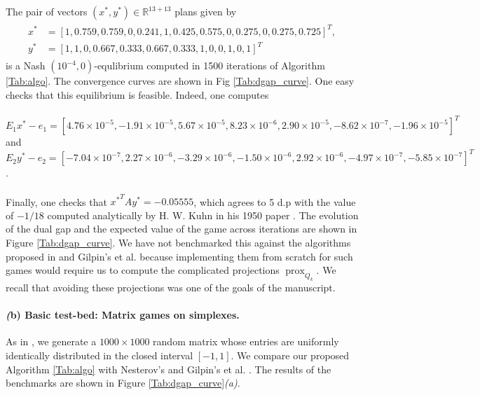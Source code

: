 \documentclass{article} %
\DeclareMathOperator{\prox}{prox}
\begin{document}
The pair of vectors $(x^*, y^*) \in \mathbb{R}^{13 + 13}$ plans given by
\begin{eqnarray*}
  \begin{split}
    x^* &= [1, 0.759, 0.759, 0, 0.241, 1, 0.425, 0.575, 0, 0.275, 0,
      0.275, 0.725]^T,\\
    y^* &= [1, 1, 0, 0.667, 0.333, 0.667, 0.333, 1, 0, 0, 1, 0, 1]^T
    \end{split}
\end{eqnarray*}
is a Nash $(10^{-4},0)$-equlibrium computed in 1500 iterations of
Algorithm  \ref{Tab:algo}. The convergence curves are shown
in Fig \ref{Tab:dgap_curve}. One easy checks that this equilibrium is
feasible. Indeed, one computes \\\\
$E_1x^* - e_1 = [4.76 \times 10^{-5}, -1.91 \times 10^{-5}, 5.67
      \times 10^{-5}, 8.23 \times 10^{-6}, 2.90 \times 10^{-5},
      -8.62 \times 10^{-7}, -1.96 \times 10^{-5}]^T$
and
$E_2y^* - e_2 = [-7.04 \times 10^{-7}, 2.27 \times 10^{-6}, -3.29
  \times 10^{-6}, -1.50 \times 10^{-6},
      2.92 \times 10^{-6}, -4.97 \times 10^{-7}, -5.85 \times
      10^{-7}]^T$.\\\\
Finally, one checks that ${x^*}^TAy^* = {-0.05555}$,
 which agrees to 5 d.p with the value of $-1 / 18$ computed
 analytically by H. W. Kuhn in his 1950 paper \cite{kuhn}. The
 evolution of the dual gap and the expected value of
 the game across iterations are shown in Figure \ref{Tab:dgap_curve}.
We have not benchmarked this against the algorithms proposed in
\cite{nesterov2005a} and Gilpin's et al. \cite{gilpinfirst} because
implementing them from scratch for such games would require us to
compute the complicated projections $\prox_{Q_k}$.  We recall that
avoiding these projections was one of the goals of the manuscript.


\paragraph{\textit(b) Basic test-bed: Matrix games on simplexes.}
As in \cite{nesterov2005a,chambolle2014ergodic}, we generate a $1000
\times 1000$ random matrix whose entries are uniformly identically
distributed in the closed interval $[-1, 1]$. We compare our proposed
Algorithm \ref{Tab:algo} with Nesterov's \cite{nesterov2005a} and
Gilpin's et al. \cite{gilpinfirst}. The results of the benchmarks are
shown in Figure \ref{Tab:dgap_curve}\textit{(a)}.
\end{document}

